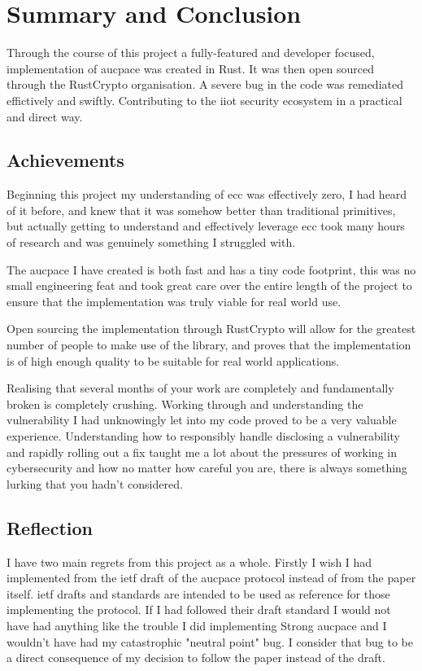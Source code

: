 \chapter{Summary and Conclusion}
\label{chap:conclusion}

Through the course of this project a fully-featured and developer focused, implementation of \gls{aucpace} was created in Rust.
It was then open sourced through the RustCrypto organisation.
A severe bug in the code was remediated effictively and swiftly.
Contributing to the \gls{iiot} security ecosystem in a practical and direct way.

\section{Achievements}
Beginning this project my understanding of \gls{ecc} was effectively zero, I had heard of it before, and knew that it was somehow better than traditional primitives, but actually getting to understand and effectively leverage \gls{ecc} took many hours of research and was genuinely something I struggled with.

The \gls{aucpace} I have created is both fast and has a tiny code footprint, this was no small engineering feat and took great care over the entire length of the project to ensure that the implementation was truly viable for real world use.

Open sourcing the implementation through RustCrypto will allow for the greatest number of people to make use of the library, and proves that the implementation is of high enough quality to be suitable for real world applications.

Realising that several months of your work are completely and fundamentally broken is completely crushing.
Working through and understanding the vulnerability I had unknowingly let into my code proved to be a very valuable experience.
Understanding how to responsibly handle disclosing a vulnerability and rapidly rolling out a fix taught me a lot about the pressures of working in cybersecurity and how no matter how careful you are, there is always something lurking that you hadn't considered.

\section{Reflection}
I have two main regrets from this project as a whole.
Firstly I wish I had implemented from the \gls{ietf} draft of the \gls{aucpace} protocol instead of from the paper itself.
\gls{ietf} drafts and standards are intended to be used as reference for those implementing the protocol.
If I had followed their draft standard I would not have had anything like the trouble I did implementing Strong \gls{aucpace} and I wouldn't have had my catastrophic "neutral point" bug.
I consider that bug to be a direct consequence of my decision to follow the paper instead of the draft.

